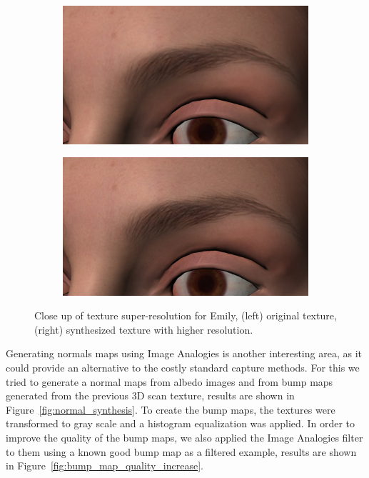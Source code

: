 \documentclass[11pt]{report}
\begin{document}
\begin{figure}
        \centering
        \begin{subfigure}[b]{0.48\textwidth}
                \includegraphics[width=\textwidth]{img/emily_close_original}
        \end{subfigure}
        \begin{subfigure}[b]{0.48\textwidth}
                \includegraphics[width=\textwidth]{img/emily_close_sr}
        \end{subfigure}
        \caption{Close up of texture super-resolution for Emily, (left) original texture, (right) synthesized texture with higher resolution.}
\end{figure}

Generating normals maps using Image Analogies is another interesting area, as it could provide an alternative to the costly standard capture methods.
For this we tried to generate a normal maps from albedo images and from bump maps generated from the previous 3D scan texture, results are shown in Figure~\ref{fig:normal_synthesis}. 
To create the bump maps, the textures were transformed to gray scale and a histogram equalization was applied.
In order to improve the quality of the bump maps, we also applied the Image Analogies filter to them using a known good bump map as a filtered example, results are shown in Figure~\ref{fig:bump_map_quality_increase}.
\end{document}
